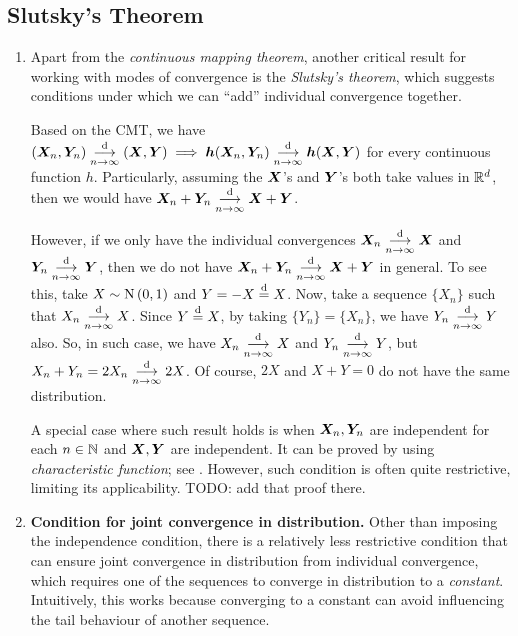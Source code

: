\subsection{Slutsky's Theorem}
\begin{enumerate}
\item Apart from the \emph{continuous mapping theorem}, another critical result
for working with modes of convergence is the \emph{Slutsky's theorem}, which
suggests conditions under which we can ``add'' individual convergence together.

Based on the CMT, we have \((\bm{X}_n,\bm{Y}_n)\underset{n\to\infty}{\overset{\text{d}}{\longrightarrow}} (\bm{X},\bm{Y})\implies 
\bm{h}(\bm{X}_n,\bm{Y}_n)\underset{n\to\infty}{\overset{\text{d}}{\longrightarrow}} \bm{h}(\bm{X},\bm{Y})\) for every
continuous function \(h\). Particularly, assuming the \(\bm{X}\)'s and
\(\bm{Y}\)'s both take values in \(\mathbb{R}^d\), then we would have
\(\bm{X}_n+\bm{Y}_n\underset{n\to\infty}{\overset{\text{d}}{\longrightarrow}} \bm{X}+\bm{Y}\).

However, if we only have the individual convergences \(\bm{X}_n\underset{n\to\infty}{\overset{\text{d}}{\longrightarrow}}
\bm{X}\) and \(\bm{Y}_n\underset{n\to\infty}{\overset{\text{d}}{\longrightarrow}} \bm{Y}\), then we do not have
\(\bm{X}_n+\bm{Y}_n\underset{n\to\infty}{\overset{\text{d}}{\longrightarrow}} \bm{X}+\bm{Y}\) in general. To see this,
take \(X\sim\operatorname{N}\left(0,1\right)\) and \(Y=-X\overset{\text{d}}= X\). Now, take a sequence \(\{X_n\}\)
such that \(X_n\underset{n\to\infty}{\overset{\text{d}}{\longrightarrow}} X\). Since \(Y\overset{\text{d}}= X\), by taking \(\{Y_n\}=\{X_n\}\),
we have \(Y_n\underset{n\to\infty}{\overset{\text{d}}{\longrightarrow}} Y\) also. So, in such case, we have \(X_n\underset{n\to\infty}{\overset{\text{d}}{\longrightarrow}} X\) and \(Y_n\underset{n\to\infty}{\overset{\text{d}}{\longrightarrow}} Y\),
but \(X_n+Y_n=2X_n\underset{n\to\infty}{\overset{\text{d}}{\longrightarrow}} 2X\). Of course, \(2X\) and \(X+Y=0\) do not have the
same distribution.
\begin{note}
A special case where such result holds is when \(\bm{X}_n,\bm{Y}_n\) are
independent for each \(n\in\mathbb{N}\) and \(\bm{X},\bm{Y}\) are independent.  It
can be proved by using \emph{characteristic function}; see
. However, such condition is often quite restrictive,
limiting its applicability. TODO: add that proof there.
\end{note}
\item \textbf{Condition for joint convergence in distribution.}
Other than imposing the independence condition, there is a relatively less
restrictive condition that can ensure joint convergence in distribution from
individual convergence, which requires one of the sequences to converge in
distribution to a \emph{constant}. Intuitively, this works because converging
to a constant can avoid influencing the tail behaviour of another sequence.


\end{enumerate}
